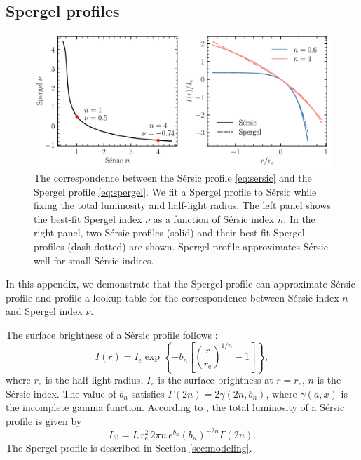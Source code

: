 \documentclass[twocolumn,astrosymb,twocolappendix]{aastex631}
\newcommand{\sersic}{S\'ersic}
\begin{document}
\begin{CJK*}{UTF8}{gbsn}
{}




\newpage
\appendix 

\section{Spergel profiles}\label{ap:spergel}
\begin{figure}[htbp!]
	\vbox{ 
		\centering
		\includegraphics[width=0.75\linewidth]{spergel_sersic_calib.pdf}
	}
    \caption{The correspondence between the \sersic{} profile \eqref{eq:sersic} and the Spergel profile \eqref{eq:spergel}. We fit a Spergel profile to \sersic{} while fixing the total luminosity and half-light radius. The left panel shows the best-fit Spergel index $\nu$ as a function of \sersic{} index $n$. In the right panel, two \sersic{} profiles (solid) and their best-fit Spergel profiles (dash-dotted) are shown. Spergel profile approximates \sersic{} well for small \sersic{} indices.  
    }
    \label{fig:spgl_calib}
\end{figure}

In this appendix, we demonstrate that the Spergel profile can approximate \sersic{} profile and profile a lookup table for the correspondence between \sersic{} index $n$ and Spergel index $\nu$.

The surface brightness of a \sersic{} profile follows \citep{Sersic1963,Graham2005}:
\begin{equation}\label{eq:sersic}
    I(r)=I_{\mathrm{e}} \exp \left\{-b_{n}\left[\left(\frac{r}{r_{\mathrm{e}}}\right)^{1 / n}-1\right]\right\},
\end{equation}
where $r_e$ is the half-light radius, $I_e$ is the surface brightness at $r=r_e$, $n$ is the \sersic{} index. The value of $b_n$ satisfies $\Gamma(2 n)=2 \gamma\left(2 n, b_{n}\right)$, where $\gamma(a, x)$ is the incomplete gamma function. According to \citet{Graham2005}, the total luminosity of a \sersic{} profile is given by 
\begin{equation}\label{eq:sersic_lum}
    L_0 = I_{e} r_{e}^{2}\, 2 \pi n\, e^{b_{n}} \left(b_{n}\right)^{-2 n} \Gamma(2 n).
\end{equation}
The Spergel profile is described in Section \ref{sec:modeling}. 


\end{CJK*}
\end{document}
